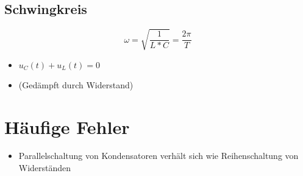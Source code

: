 \subsection{Schwingkreis}

$$\omega = \sqrt{\frac{1}{L * C}} = \frac{2\pi}{T}$$

\begin{itemize}
  \item $u_C(t) + u_L(t) = 0$
  \item (Gedämpft durch Widerstand)
\end{itemize}

\section{Häufige Fehler}

\begin{itemize}
  \item Parallelschaltung von Kondensatoren verhält sich wie Reihenschaltung von Widerständen
\end{itemize}